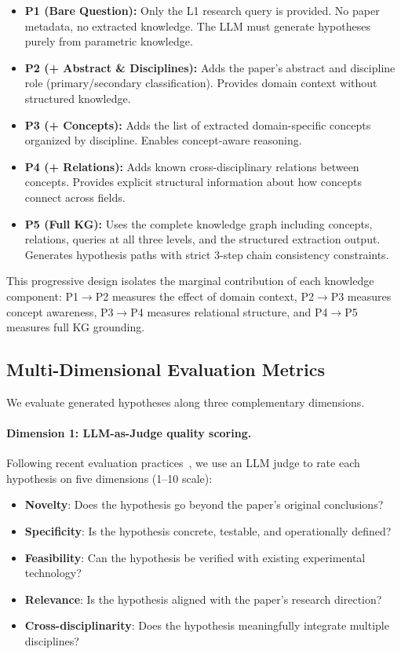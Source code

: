 \documentclass{article}
\begin{document}
\begin{itemize}[leftmargin=*,topsep=2pt,itemsep=2pt]
\item \textbf{P1 (Bare Question):} Only the L1 research query is provided. No paper metadata, no extracted knowledge. The LLM must generate hypotheses purely from parametric knowledge.
\item \textbf{P2 (+ Abstract \& Disciplines):} Adds the paper's abstract and discipline role (primary/secondary classification). Provides domain context without structured knowledge.
\item \textbf{P3 (+ Concepts):} Adds the list of extracted domain-specific concepts organized by discipline. Enables concept-aware reasoning.
\item \textbf{P4 (+ Relations):} Adds known cross-disciplinary relations between concepts. Provides explicit structural information about how concepts connect across fields.
\item \textbf{P5 (Full KG):} Uses the complete knowledge graph including concepts, relations, queries at all three levels, and the structured extraction output. Generates hypothesis paths with strict 3-step chain consistency constraints.
\end{itemize}

This progressive design isolates the marginal contribution of each knowledge component: P1$\to$P2 measures the effect of domain context, P2$\to$P3 measures concept awareness, P3$\to$P4 measures relational structure, and P4$\to$P5 measures full KG grounding.

\subsection{Multi-Dimensional Evaluation Metrics}
\label{sec:metrics}

We evaluate generated hypotheses along three complementary dimensions.

\paragraph{Dimension 1: LLM-as-Judge quality scoring.}
Following recent evaluation practices~\cite{zheng2024judging}, we use an LLM judge to rate each hypothesis on five dimensions (1--10 scale):
\begin{itemize}[leftmargin=*,topsep=1pt,itemsep=0pt]
\item \textbf{Novelty}: Does the hypothesis go beyond the paper's original conclusions?
\item \textbf{Specificity}: Is the hypothesis concrete, testable, and operationally defined?
\item \textbf{Feasibility}: Can the hypothesis be verified with existing experimental technology?
\item \textbf{Relevance}: Is the hypothesis aligned with the paper's research direction?
\item \textbf{Cross-disciplinarity}: Does the hypothesis meaningfully integrate multiple disciplines?
\end{itemize}
\end{document}
